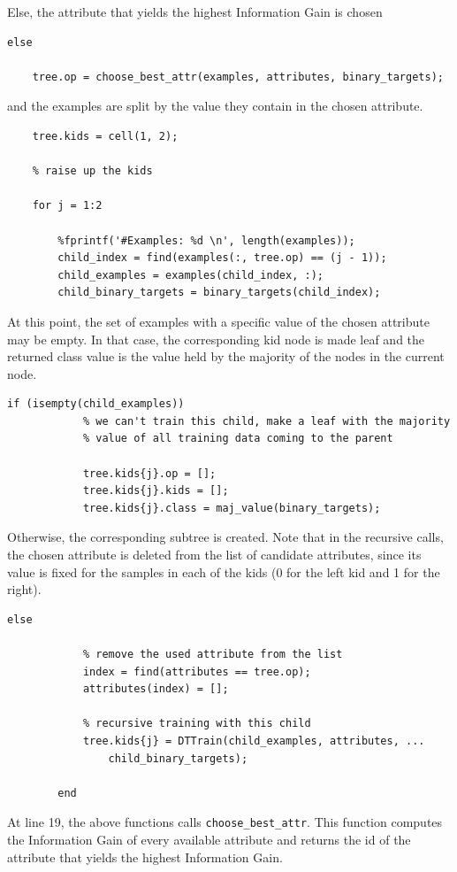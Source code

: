 \documentclass{article}
\begin{document}
Else, the attribute that yields the highest Information Gain is chosen
\begin{lstlisting}[firstnumber=17]
else
    
    tree.op = choose_best_attr(examples, attributes, binary_targets);
\end{lstlisting}
and the examples are split by the value they contain in the chosen attribute.
\begin{lstlisting}
    tree.kids = cell(1, 2);
        
    % raise up the kids
    
    for j = 1:2
        
        %fprintf('#Examples: %d \n', length(examples));
        child_index = find(examples(:, tree.op) == (j - 1));
        child_examples = examples(child_index, :);     
        child_binary_targets = binary_targets(child_index);
\end{lstlisting}
At this point, the set of examples with a specific value of the chosen attribute may be empty. In that case, the corresponding kid node is made leaf and the returned class value is the value held by the majority of the nodes in the current node.
\begin{lstlisting}[firstnumber=36]
        if (isempty(child_examples))
            % we can't train this child, make a leaf with the majority
            % value of all training data coming to the parent
            
            tree.kids{j}.op = [];
            tree.kids{j}.kids = [];
            tree.kids{j}.class = maj_value(binary_targets);
\end{lstlisting}
Otherwise, the corresponding subtree is created. Note that in the recursive calls, the chosen attribute is deleted from the list of candidate attributes, since its value is fixed for the samples in each of the kids (0 for the left kid and 1 for the right).
\begin{lstlisting}[firstnumber=44]
        else 
            
            % remove the used attribute from the list
            index = find(attributes == tree.op);
            attributes(index) = [];
            
            % recursive training with this child
            tree.kids{j} = DTTrain(child_examples, attributes, ...
                child_binary_targets);
                    
        end
\end{lstlisting}
At line 19, the above functions calls \verb$choose_best_attr$. This function computes the Information Gain of every available attribute and returns the id of the attribute that yields the highest Information Gain.
\end{document}
